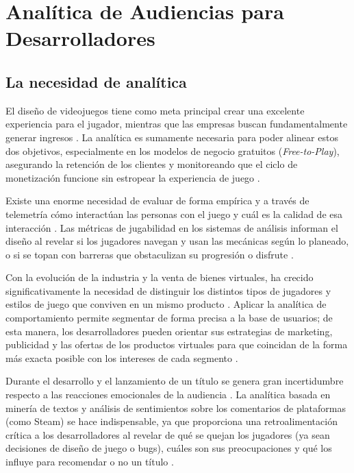 \section{Analítica de Audiencias para Desarrolladores}\label{sec:analitica_audiencias}

\subsection{La necesidad de analítica}\label{subsec:necesidad_analitica}

El diseño de videojuegos tiene como meta principal crear una excelente experiencia para el jugador, mientras que las empresas buscan fundamentalmente generar ingresos \parencite{DrachenEtAl2011}. La analítica es sumamente necesaria para poder alinear estos dos objetivos, especialmente en los modelos de negocio gratuitos (\emph{Free-to-Play}), asegurando la retención de los clientes y monitoreando que el ciclo de monetización funcione sin estropear la experiencia de juego \parencite{DrachenEtAl2011}.

Existe una enorme necesidad de evaluar de forma empírica y a través de telemetría cómo interactúan las personas con el juego y cuál es la calidad de esa interacción \parencite{DrachenEtAl2011}. Las métricas de jugabilidad en los sistemas de análisis informan el diseño al revelar si los jugadores navegan y usan las mecánicas según lo planeado, o si se topan con barreras que obstaculizan su progresión o disfrute \parencite{DrachenEtAl2011}.

Con la evolución de la industria y la venta de bienes virtuales, ha crecido significativamente la necesidad de distinguir los distintos tipos de jugadores y estilos de juego que conviven en un mismo producto \parencite{TuunanenHamari2012}. Aplicar la analítica de comportamiento permite segmentar de forma precisa a la base de usuarios; de esta manera, los desarrolladores pueden orientar sus estrategias de marketing, publicidad y las ofertas de los productos virtuales para que coincidan de la forma más exacta posible con los intereses de cada segmento \parencite{TuunanenHamari2012}.

Durante el desarrollo y el lanzamiento de un título se genera gran incertidumbre respecto a las reacciones emocionales de la audiencia \parencite{GuzsvineczSzucs2023}. La analítica basada en minería de textos y análisis de sentimientos sobre los comentarios de plataformas (como Steam) se hace indispensable, ya que proporciona una retroalimentación crítica a los desarrolladores al revelar de qué se quejan los jugadores (ya sean decisiones de diseño de juego o bugs), cuáles son sus preocupaciones y qué los influye para recomendar o no un título \parencite{GuzsvineczSzucs2023}.

